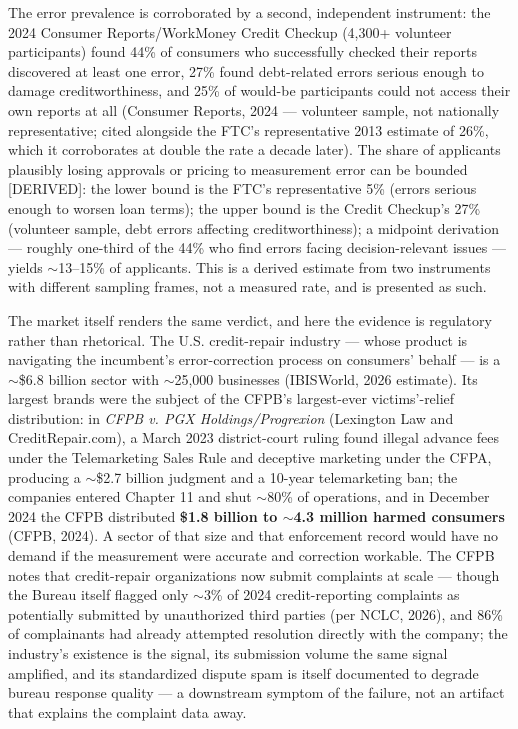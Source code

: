 \documentclass[
]{article}
\begin{document}
The error prevalence is corroborated by a second, independent
instrument: the 2024 Consumer Reports/WorkMoney Credit Checkup (4,300+
volunteer participants) found 44\% of consumers who successfully checked
their reports discovered at least one error, 27\% found debt-related
errors serious enough to damage creditworthiness, and 25\% of would-be
participants could not access their own reports at all (Consumer
Reports, 2024 --- volunteer sample, not nationally representative; cited
alongside the FTC's representative 2013 estimate of 26\%, which it
corroborates at double the rate a decade later). The share of applicants
plausibly losing approvals or pricing to measurement error can be
bounded {[}DERIVED{]}: the lower bound is the FTC's representative 5\%
(errors serious enough to worsen loan terms); the upper bound is the
Credit Checkup's 27\% (volunteer sample, debt errors affecting
creditworthiness); a midpoint derivation --- roughly one-third of the
44\% who find errors facing decision-relevant issues --- yields
\(\sim\)13--15\% of applicants. This is a derived estimate from two
instruments with different sampling frames, not a measured rate, and is
presented as such.

The market itself renders the same verdict, and here the evidence is
regulatory rather than rhetorical. The U.S. credit-repair industry ---
whose product is navigating the incumbent's error-correction process on
consumers' behalf --- is a \(\sim\)\$6.8 billion sector with
\(\sim\)25,000 businesses (IBISWorld, 2026 estimate). Its largest brands
were the subject of the CFPB's largest-ever victims'-relief
distribution: in \emph{CFPB v. PGX Holdings/Progrexion} (Lexington Law
and CreditRepair.com), a March 2023 district-court ruling found illegal
advance fees under the Telemarketing Sales Rule and deceptive marketing
under the CFPA, producing a \(\sim\)\$2.7 billion judgment and a 10-year
telemarketing ban; the companies entered Chapter 11 and shut
\(\sim\)80\% of operations, and in December 2024 the CFPB distributed
\textbf{\$1.8 billion to \(\sim\)4.3 million harmed consumers} (CFPB,
2024). A sector of that size and that enforcement record would have no
demand if the measurement were accurate and correction workable. The
CFPB notes that credit-repair organizations now submit complaints at
scale --- though the Bureau itself flagged only \(\sim\)3\% of 2024
credit-reporting complaints as potentially submitted by unauthorized
third parties (per NCLC, 2026), and 86\% of complainants had already
attempted resolution directly with the company; the industry's existence
is the signal, its submission volume the same signal amplified, and its
standardized dispute spam is itself documented to degrade bureau
response quality --- a downstream symptom of the failure, not an
artifact that explains the complaint data away.
\end{document}
